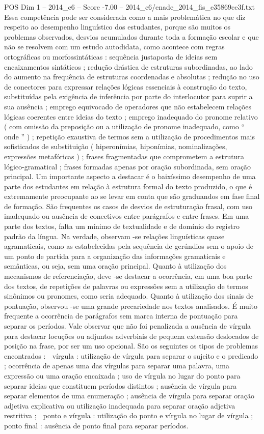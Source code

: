 \begin{textsample}{POS Dim 1 – 2014\_c6 – Score -7.00 – 2014\_c6/enade\_2014\_fis\_e35869ce3f.txt}
Essa competência pode ser considerada como a mais problemática no que diz respeito ao desempenho linguístico dos estudantes, porque são muitos os problemas observados, desvios acumulados durante toda a formação escolar e que não se resolvem com um estudo autodidata, como acontece com regras ortográficas ou morfossintáticas : sequência justaposta de ideias sem encaixamentos sintáticos ; redução drástica de estruturas subordinadas, ao lado do aumento na frequência de estruturas coordenadas e absolutas ; redução no uso de conectores para expressar relações lógicas essenciais à construção do texto, substituídas pela exigência de inferência por parte do interlocutor para suprir a sua ausência ; emprego equivocado de operadores que não estabelecem relações lógicas coerentes entre ideias do texto ; emprego inadequado do pronome relativo ( com omissão da preposição ou a utilização de pronome inadequado, como “ onde ” ) ; repetição exaustiva de termos sem a utilização de procedimentos mais sofisticados de substituição ( hiperonímias, hiponímias, nominalizações, expressões metafóricas ) ; frases fragmentadas que comprometem a estrutura lógico-gramatical ; frases formadas apenas por oração subordinada, sem oração principal.
Um importante aspecto a destacar é o baixíssimo desempenho de uma parte dos estudantes em relação à estrutura formal do texto produzido, o que é extremamente preocupante ao se levar em conta que são graduandos em fase final de formação.
São frequentes os casos de desvios de estruturação frasal, com uso inadequado ou ausência de conectivos entre parágrafos e entre frases.
Em uma parte dos textos, falta um mínimo de textualidade e de domínio do registro padrão da língua.
Na verdade, observam -se relações linguísticas quase agramaticais, como as estabelecidas pela sequência de gerúndios sem o apoio de um ponto de partida para a organização das informações gramaticais e semânticas, ou seja, sem uma oração principal.
Quanto à utilização dos mecanismos de referenciação, deve -se destacar a ocorrência, em uma boa parte dos textos, de repetições de palavras ou expressões sem a utilização de termos sinônimos ou pronomes, como seria adequado.
Quanto à utilização dos sinais de pontuação, observou -se uma grande precariedade nos textos analisados.
É muito frequente a ocorrência de parágrafos sem marca interna de pontuação para separar os períodos.
Vale observar que não foi penalizada a ausência de vírgula para destacar locuções ou adjuntos adverbiais de pequena extensão deslocados de posição na frase, por ser um uso opcional.
São os seguintes os tipos de problemas encontrados :  vírgula : utilização de vírgula para separar o sujeito e o predicado ; ocorrência de apenas uma das vírgulas para separar uma palavra, uma expressão ou uma oração encaixada ; uso de vírgula no lugar do ponto para separar ideias que constituem períodos distintos ; ausência de vírgula para separar elementos de uma enumeração ; ausência de vírgula para separar oração adjetiva explicativa ou utilização inadequada para separar oração adjetiva restritiva ;  ponto e vírgula : utilização do ponto e vírgula no lugar de vírgula ;  ponto final : ausência de ponto final para separar períodos.

\end{textsample}

